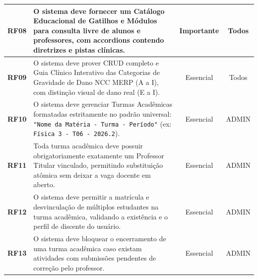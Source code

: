 \begin{table}[htb]
\begin{tabularx}{\textwidth}{l X c c}
\midrule
\textbf{RF08} & O sistema deve fornecer um Catálogo Educacional de Gatilhos e Módulos para consulta livre de alunos e professores, com accordions contendo diretrizes e pistas clínicas. & Importante & Todos \\
\midrule
\textbf{RF09} & O sistema deve prover CRUD completo e Guia Clínico Interativo das Categorias de Gravidade de Dano NCC MERP (A a I), com distinção visual de dano real (E a I). & Essencial & Todos \\
\midrule
\textbf{RF10} & O sistema deve gerenciar Turmas Acadêmicas formatadas estritamente no padrão universal: \texttt{"Nome da Matéria - Turma - Período"} (ex: \texttt{Física 3 - T06 - 2026.2}). & Essencial & ADMIN \\
\midrule
\textbf{RF11} & Toda turma acadêmica deve possuir obrigatoriamente exatamente um Professor Titular vinculado, permitindo substituição atômica sem deixar a vaga docente em aberto. & Essencial & ADMIN \\
\midrule
\textbf{RF12} & O sistema deve permitir a matrícula e desvinculação de múltiplos estudantes na turma acadêmica, validando a existência e o perfil de discente do usuário. & Essencial & ADMIN \\
\midrule
\textbf{RF13} & O sistema deve bloquear o encerramento de uma turma acadêmica caso existam atividades com submissões pendentes de correção pelo professor. & Essencial & ADMIN \\
\bottomrule
\end{tabularx}
\end{table}

